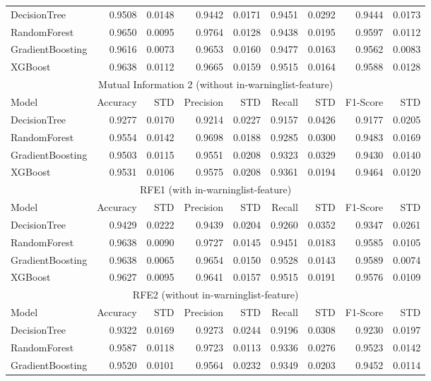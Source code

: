 \documentclass[11pt]{article}
\begin{document}
\begin{tabular}{l|rr|rr|rr|rr}
	\hline
	DecisionTree & 0.9508 & 0.0148 & 0.9442 & 0.0171 & 0.9451 & 0.0292 & 0.9444 & 0.0173 \\
	RandomForest  & 0.9650 & 0.0095 & 0.9764 & 0.0128 & 0.9438 & 0.0195 & 0.9597 & 0.0112 \\
	GradientBoosting & 0.9616 & 0.0073 & 0.9653 & 0.0160 & 0.9477 & 0.0163 & 0.9562 & 0.0083 \\
	XGBoost & 0.9638 & 0.0112 & 0.9665 & 0.0159 & 0.9515 & 0.0164 & 0.9588 & 0.0128 \\
	\multicolumn{9}{c}{Mutual Information 2 (without in-warninglist-feature)}\\
	Model & Accuracy & STD & Precision & STD & Recall & STD & F1-Score & STD \\
	\hline
	DecisionTree & 0.9277 & 0.0170 & 0.9214 & 0.0227 & 0.9157 & 0.0426 & 0.9177 & 0.0205 \\
	RandomForest & 0.9554 & 0.0142 & 0.9698 & 0.0188 & 0.9285 & 0.0300 & 0.9483 & 0.0169 \\
	GradientBoosting & 0.9503 & 0.0115 & 0.9551 & 0.0208 & 0.9323 & 0.0329 & 0.9430 & 0.0140 \\
	XGBoost & 0.9531 & 0.0106 & 0.9575 & 0.0208 & 0.9361 & 0.0194 & 0.9464 & 0.0120 \\
	\multicolumn{9}{c}{RFE1 (with in-warninglist-feature)}\\
	Model & Accuracy & STD & Precision & STD & Recall & STD & F1-Score & STD \\
	\hline
	DecisionTree  & 0.9429 & 0.0222 & 0.9439 & 0.0204 & 0.9260 & 0.0352 & 0.9347 & 0.0261 \\
	RandomForest & 0.9638 & 0.0090 & 0.9727 & 0.0145 & 0.9451 & 0.0183 & 0.9585 & 0.0105 \\
	GradientBoosting & 0.9638 & 0.0065 & 0.9654 & 0.0150 & 0.9528 & 0.0143 & 0.9589 & 0.0074 \\
	XGBoost & 0.9627 & 0.0095 & 0.9641 & 0.0157 & 0.9515 & 0.0191 & 0.9576 & 0.0109 \\
	\multicolumn{9}{c}{RFE2 (without in-warninglist-feature)}\\
	Model & Accuracy & STD & Precision & STD & Recall & STD & F1-Score & STD \\
	\hline
	DecisionTree & 0.9322 & 0.0169 & 0.9273 & 0.0244 & 0.9196 & 0.0308 & 0.9230 & 0.0197 \\
	RandomForest & 0.9587 & 0.0118 & 0.9723 & 0.0113 & 0.9336 & 0.0276 & 0.9523 & 0.0142 \\
	GradientBoosting  & 0.9520 & 0.0101 & 0.9564 & 0.0232 & 0.9349 & 0.0203 & 0.9452 & 0.0114 \\

\end{tabular}
\end{document}
